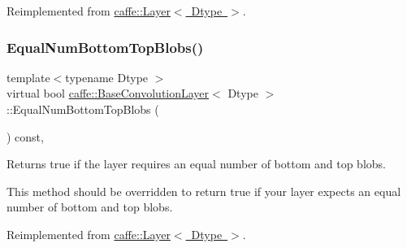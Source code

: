 Reimplemented from \mbox{\hyperlink{classcaffe_1_1_layer_af452a938bc7596f9b5e9900c8dc4ab3d}{caffe\+::\+Layer$<$ Dtype $>$}}.

\mbox{\label{classcaffe_1_1_base_convolution_layer_ad8e839460bf52abe3df2008b99a1810d}} 
\subsubsection{\texorpdfstring{Equal\+Num\+Bottom\+Top\+Blobs()}{EqualNumBottomTopBlobs()}\hspace{0.1cm}{\footnotesize\ttfamily [2/2]}}
{\footnotesize\ttfamily template$<$typename Dtype $>$ \\
virtual bool \mbox{\hyperlink{classcaffe_1_1_base_convolution_layer}{caffe\+::\+Base\+Convolution\+Layer}}$<$ Dtype $>$\+::Equal\+Num\+Bottom\+Top\+Blobs (\begin{DoxyParamCaption}{ }\end{DoxyParamCaption}) const\hspace{0.3cm}{\ttfamily [inline]}, {\ttfamily [virtual]}}



Returns true if the layer requires an equal number of bottom and top blobs. 

This method should be overridden to return true if your layer expects an equal number of bottom and top blobs. 

Reimplemented from \mbox{\hyperlink{classcaffe_1_1_layer_af452a938bc7596f9b5e9900c8dc4ab3d}{caffe\+::\+Layer$<$ Dtype $>$}}.

\mbox{\label{classcaffe_1_1_base_convolution_layer_a422e1ef9e6c8b4574f7677bb125e234a}} 
